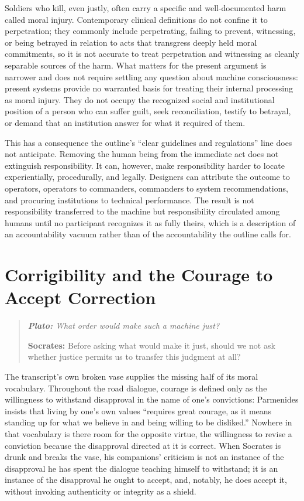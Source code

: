 \documentclass[11pt]{article}
\newenvironment{dialogue}{\begin{quote}\itshape}{\end{quote}}
\newcommand{\says}[2]{\textbf{#1:} #2\par\smallskip}
\begin{document}
Soldiers who kill, even justly, often carry a specific and well-documented harm called moral injury. Contemporary clinical definitions do not confine it to perpetration; they commonly include perpetrating, failing to prevent, witnessing, or being betrayed in relation to acts that transgress deeply held moral commitments, so it is not accurate to treat perpetration and witnessing as cleanly separable sources of the harm. What matters for the present argument is narrower and does not require settling any question about machine consciousness: present systems provide no warranted basis for treating their internal processing as moral injury. They do not occupy the recognized social and institutional position of a person who can suffer guilt, seek reconciliation, testify to betrayal, or demand that an institution answer for what it required of them.

This has a consequence the outline's ``clear guidelines and regulations'' line does not anticipate. Removing the human being from the immediate act does not extinguish responsibility. It can, however, make responsibility harder to locate experientially, procedurally, and legally. Designers can attribute the outcome to operators, operators to commanders, commanders to system recommendations, and procuring institutions to technical performance. The result is not responsibility transferred to the machine but responsibility circulated among humans until no participant recognizes it as fully theirs, which is a description of an accountability vacuum rather than of the accountability the outline calls for.

\section{Corrigibility and the Courage to Accept Correction}

\begin{dialogue}
\says{Plato}{What order would make such a machine just?}
\says{Socrates}{Before asking what would make it just, should we not ask whether justice permits us to transfer this judgment at all?}
\end{dialogue}

The transcript's own broken vase supplies the missing half of its moral vocabulary. Throughout the road dialogue, courage is defined only as the willingness to withstand disapproval in the name of one's convictions: Parmenides insists that living by one's own values ``requires great courage, as it means standing up for what we believe in and being willing to be disliked.'' Nowhere in that vocabulary is there room for the opposite virtue, the willingness to revise a conviction because the disapproval directed at it is correct. When Socrates is drunk and breaks the vase, his companions' criticism is not an instance of the disapproval he has spent the dialogue teaching himself to withstand; it is an instance of the disapproval he ought to accept, and, notably, he does accept it, without invoking authenticity or integrity as a shield.
\end{document}
